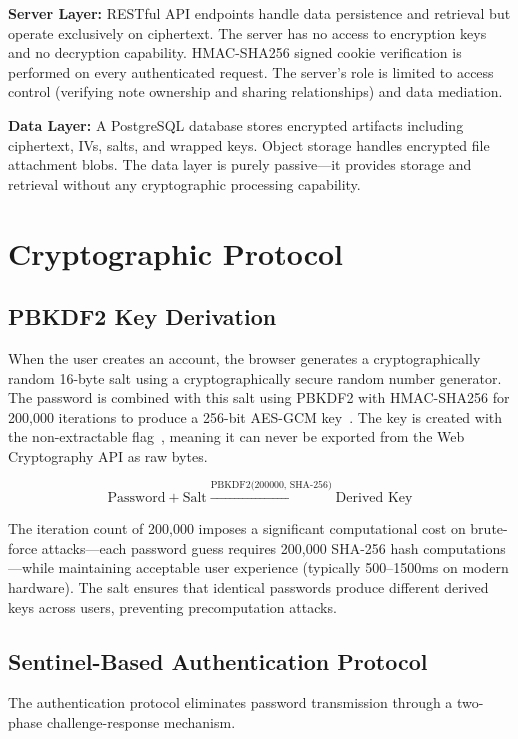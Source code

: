 \documentclass[conference]{IEEEtran}
\begin{document}
\textbf{Server Layer:} RESTful API endpoints handle data persistence and retrieval but operate exclusively on ciphertext. The server has no access to encryption keys and no decryption capability. HMAC-SHA256 signed cookie verification is performed on every authenticated request. The server's role is limited to access control (verifying note ownership and sharing relationships) and data mediation.

\textbf{Data Layer:} A PostgreSQL database stores encrypted artifacts including ciphertext, IVs, salts, and wrapped keys. Object storage handles encrypted file attachment blobs. The data layer is purely passive---it provides storage and retrieval without any cryptographic processing capability.

\section{Cryptographic Protocol}

\subsection{PBKDF2 Key Derivation}

When the user creates an account, the browser generates a cryptographically random 16-byte salt using a cryptographically secure random number generator. The password is combined with this salt using PBKDF2 with HMAC-SHA256 for 200,000 iterations to produce a 256-bit AES-GCM key~\cite{ref3,ref12,ref17}. The key is created with the non-extractable flag~\cite{ref1}, meaning it can never be exported from the Web Cryptography API as raw bytes.

\[
\text{Password} + \text{Salt} \xrightarrow{\text{PBKDF2(200000, SHA-256)}} \text{Derived Key}
\]

The iteration count of 200,000 imposes a significant computational cost on brute-force attacks---each password guess requires 200,000 SHA-256 hash computations---while maintaining acceptable user experience (typically 500--1500ms on modern hardware). The salt ensures that identical passwords produce different derived keys across users, preventing precomputation attacks.

\subsection{Sentinel-Based Authentication Protocol}

The authentication protocol eliminates password transmission through a two-phase challenge-response mechanism.
\end{document}
